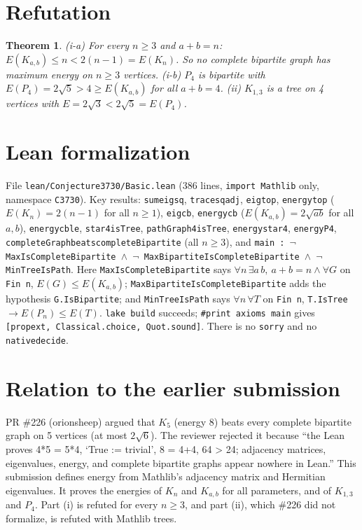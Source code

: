 \documentclass[11pt]{article}
\renewcommand{\_}{\oldus\allowbreak}
\newtheorem{theorem}{Theorem}
\theoremstyle{definition}
\theoremstyle{remark}
\begin{document}
\section{Refutation}

\begin{theorem}
(i-a) For every $n\ge3$ and $a+b=n$: $E(K_{a,b})\le n<2(n-1)=E(K_n)$. So no complete bipartite graph has
maximum energy on $n\ge3$ vertices.
(i-b) $P_4$ is bipartite with $E(P_4)=2\sqrt5>4\ge E(K_{a,b})$ for all $a+b=4$.
(ii) $K_{1,3}$ is a tree on 4 vertices with $E=2\sqrt3<2\sqrt5=E(P_4)$.
\end{theorem}

\section{Lean formalization}

File \texttt{lean/Conjecture3730/Basic.lean} (386 lines, \texttt{import Mathlib} only, namespace
\texttt{C3730}). Key results: \texttt{sum\_eig\_sq}, \texttt{trace\_sq\_adj}, \texttt{eig\_top},
\texttt{energy\_top} ($E(K_n)=2(n-1)$ for all $n\ge1$), \texttt{eig\_cb}, \texttt{energy\_cb}
($E(K_{a,b})=2\sqrt{ab}$ for all $a,b$), \texttt{energy\_cb\_le}, \texttt{star4\_isTree},
\texttt{pathGraph4\_isTree}, \texttt{energy\_star4}, \texttt{energy\_P4},
\texttt{completeGraph\_beats\_completeBipartite} (all $n\ge3$), and
\texttt{main : $\neg$ MaxIsCompleteBipartite $\wedge$ $\neg$ MaxBipartiteIsCompleteBipartite $\wedge$
$\neg$ MinTreeIsPath}. Here \texttt{MaxIsCompleteBipartite} says
$\forall n\,\exists a\,b,\ a+b=n\wedge\forall G$ on \texttt{Fin n}, $E(G)\le E(K_{a,b})$;
\texttt{MaxBipartiteIsCompleteBipartite} adds the hypothesis \texttt{G.IsBipartite}; and
\texttt{MinTreeIsPath} says $\forall n\,\forall T$ on \texttt{Fin n}, \texttt{T.IsTree} $\to E(P_n)\le E(T)$.
\texttt{lake build} succeeds; \texttt{\#print axioms main} gives
\texttt{[propext, Classical.choice, Quot.sound]}. There is no \texttt{sorry} and no
\texttt{native\_decide}.

\section{Relation to the earlier submission}

PR \#226 (orionsheep) argued that $K_5$ (energy 8) beats every complete bipartite graph on 5 vertices
(at most $2\sqrt6$). The reviewer rejected it because ``the Lean proves 4*5 = 5*4, `True := trivial', 8 = 4+4,
64 > 24; adjacency matrices, eigenvalues, energy, and complete bipartite graphs appear nowhere in Lean.''
This submission defines energy from Mathlib's adjacency matrix and Hermitian eigenvalues. It proves the
energies of $K_n$ and $K_{a,b}$ for all parameters, and of $K_{1,3}$ and $P_4$. Part (i) is refuted for every
$n\ge3$, and part (ii), which \#226 did not formalize, is refuted with Mathlib trees.
\end{document}
